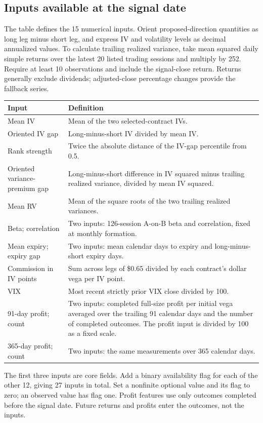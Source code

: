 \documentclass[11pt,letterpaper]{article}
\newcommand{\money}[1]{\$#1}
\begin{document}
\subsection{Inputs available at the signal date}
\label{app:features}
The table defines the 15 numerical inputs. Orient proposed-direction
quantities as long leg minus short leg, and express IV and volatility levels
as decimal annualized values. To calculate trailing realized variance, take
mean squared daily simple returns over the latest 20 listed trading sessions
and multiply by 252. Require at least 10 observations and include the
signal-close return. Returns generally exclude dividends; adjusted-close
percentage changes provide the fallback series.

\begin{center}
\footnotesize
\begin{tabular}{p{}p{}}
\toprule
Input & Definition\\
\midrule
Mean IV & Mean of the two selected-contract IVs.\\
Oriented IV gap & Long-minus-short IV divided by mean IV.\\
Rank strength & Twice the absolute distance of the IV-gap percentile from 0.5.\\
Oriented variance-premium gap & Long-minus-short difference in IV squared minus trailing realized variance, divided by mean IV squared.\\
Mean RV & Mean of the square roots of the two trailing realized variances.\\
Beta; correlation & Two inputs: 126-session A-on-B beta and correlation, fixed at monthly formation.\\
Mean expiry; expiry gap & Two inputs: mean calendar days to expiry and long-minus-short expiry days.\\
Commission in IV points & Sum across legs of \money{0.65} divided by each contract's dollar vega per IV point.\\
VIX & Most recent strictly prior VIX close divided by 100.\\
91-day profit; count & Two inputs: completed full-size profit per initial vega averaged over the trailing 91 calendar days and the number of completed outcomes. The profit input is divided by 100 as a fixed scale.\\
365-day profit; count & Two inputs: the same measurements over 365 calendar days.\\
\bottomrule
\end{tabular}
\end{center}
The first three inputs are core fields. Add a binary availability flag for
each of the other 12, giving 27 inputs in total. Set a nonfinite optional
value and its flag to zero; an observed value has flag one. Profit features
use only outcomes completed before the signal date. Future returns and profits
enter the outcomes, not the inputs.
\end{document}
